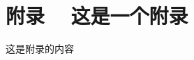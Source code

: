 \documentclass[a4paper,12pt]{article}
\begin{document}







%
%
%
%
%




\section*{附录 ~ 这是一个附录}

这是附录的内容
\end{document}
